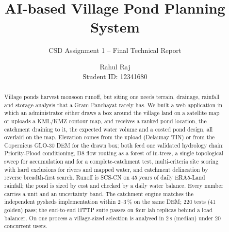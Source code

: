 \documentclass[manuscript,screen,review]{acmart}
\begin{document}
\title{AI-based Village Pond Planning System}
\subtitle{CSD Assignment 1 -- Final Technical Report}

\author{Rahul Raj\protect\\ \protect\normalfont\protect\small Student ID: 12341680}

\renewcommand{\shortauthors}{Rahul Raj}

\begin{abstract}
Village ponds harvest monsoon runoff, but siting one needs terrain, drainage, rainfall and
storage analysis that a Gram Panchayat rarely has. We built a web application in which an
administrator either draws a box around the village land on a satellite map or uploads a
KML/KMZ contour map, and receives a ranked pond location, the catchment draining to it, the
expected water volume and a costed pond design, all overlaid on the map. Elevation comes from
the upload (Delaunay TIN) or from the Copernicus GLO-30 DEM for the drawn box; both feed
one validated hydrology chain: Priority-Flood conditioning, D8 flow routing as a forest
of in-trees, a single topological sweep for accumulation and for a complete-catchment test,
multi-criteria site scoring with hard exclusions for rivers and mapped water, and catchment
delineation by reverse breadth-first search. Runoff is SCS-CN on 45 years of daily ERA5-Land
rainfall; the pond is sized by cost and checked by a daily water balance. Every number
carries a unit and an uncertainty band. The catchment engine matches the independent
pysheds implementation within 2--3\,\% on the same DEM; 220 tests (41 golden) pass;
the end-to-end HTTP suite passes on four lab replicas behind a load balancer. On one process a village-sized
selection is analysed in 2\,s (median) under 20 concurrent users.
\end{abstract}


\maketitle

\end{document}

